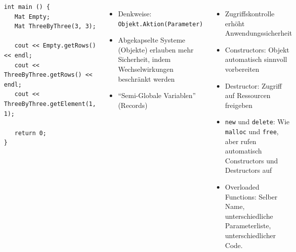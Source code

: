 \begin{frame}[fragile]
%
\begin{columns}[T]
\vspace{-6pt}
\begin{codebox}[... Fortsetzung]
\begin{verbatim}
int main () {
   Mat Empty;
   Mat ThreeByThree(3, 3);

   cout << Empty.getRows() << endl;
   cout << ThreeByThree.getRows() << endl;
   cout << ThreeByThree.getElement(1, 1);

   return 0;
}
\end{verbatim}
\end{codebox}
%
\begin{itemize}
\item Denkweise: \texttt{Objekt.Aktion(Parameter)}
\item Abgekapselte Systeme (Objekte) erlauben mehr Sicherheit, indem Wechselwirkungen beschränkt werden
\item \enquote{Semi-Globale Variablen} (\ie Records)
\end{itemize}
%	
\begin{itemize}
\item Zugriffskontrolle erhöht Anwendungssicherheit
\item Constructors: Objekt automatisch sinnvoll vorbereiten
\item Destructor: Zugriff auf Ressourcen freigeben
\item \texttt{new} und \texttt{delete}: Wie \texttt{malloc} und 
	\texttt{free}, aber rufen automatisch Constructors und Destructors auf
\item Overloaded Functions: Selber Name, unterschiedliche Parameterliste, unterschiedlicher Code.
\end{itemize}
\end{columns}
%
\end{frame}


